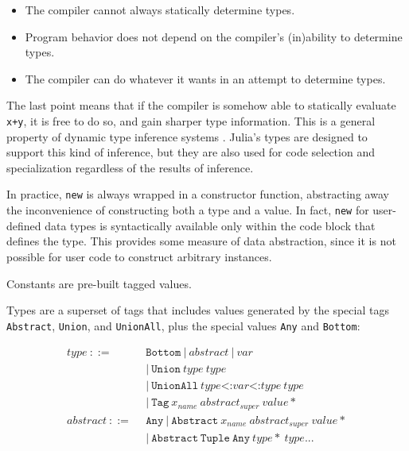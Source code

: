 \begin{itemize}
\item The compiler cannot always statically determine types.
\item Program behavior does not depend on the compiler's (in)ability to
determine types.
\item The compiler can do whatever it wants in an attempt to determine types.
\end{itemize}

The last point means that if the compiler is somehow able to statically
evaluate \texttt{x+y}, it is free to do so, and gain sharper type information.
This is a general property of dynamic type inference systems
\cite{kaplanullman,TICL,pticl,nimble,rubydust}.
Julia's types are designed to support this kind of inference, but they
are also used for code selection and specialization regardless of the
results of inference.

In practice, \texttt{new} is always wrapped in a constructor function,
abstracting away the inconvenience of constructing both a type and a value.
In fact, \texttt{new} for user-defined data types is syntactically
available only within the code block that defines the type.
This provides some measure of data abstraction, since it is not possible
for user code to construct arbitrary instances.

Constants are pre-built tagged values.

Types are a superset of tags that includes values generated by the
special tags \texttt{Abstract}, \texttt{Union}, and \texttt{UnionAll},
plus the special values \texttt{Any} and \texttt{Bottom}:

\vspace{-3ex}
\begin{singlespace}
\begin{align*}
  type\ ::=\ &\ \texttt{Bottom}\ |\ abstract\ |\ var \\
             &\ |\ \texttt{Union}\ type\ type \\
             &\ |\ \texttt{UnionAll}\ type\texttt{<:}var\texttt{<:}type\ type \\
             &\ |\ \texttt{Tag}\ x_{name}\ abstract_{super}\ value* \\
  abstract\ ::=\ &\ \texttt{Any}\ |\ \texttt{Abstract}\ x_{name}\ abstract_{super}\ value* \\
                 &\ |\ \texttt{Abstract}\ \texttt{Tuple}\ \texttt{Any}\ type*\ type\texttt{...}
\end{align*}
\end{singlespace}

